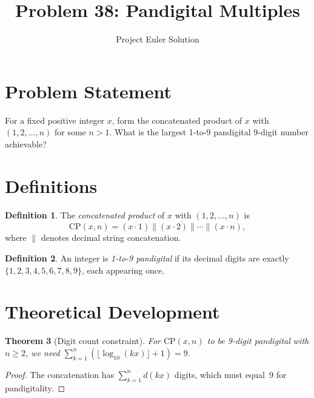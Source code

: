 \documentclass[12pt]{article}
\title{Problem 38: Pandigital Multiples}
\author{Project Euler Solution}
\date{}
\newtheorem{theorem}{Theorem}
\theoremstyle{definition}
\newtheorem{definition}[theorem]{Definition}
\begin{document}
\maketitle

\section{Problem Statement}
For a fixed positive integer $x$, form the concatenated product of $x$ with $(1, 2, \ldots, n)$ for some $n > 1$. What is the largest 1-to-9 pandigital 9-digit number achievable?

\section{Definitions}

\begin{definition}
The \emph{concatenated product} of $x$ with $(1, 2, \ldots, n)$ is
\[
    \mathrm{CP}(x, n) = \overline{(x \cdot 1) \| (x \cdot 2) \| \cdots \| (x \cdot n)},
\]
where $\|$ denotes decimal string concatenation.
\end{definition}

\begin{definition}
An integer is \emph{1-to-9 pandigital} if its decimal digits are exactly $\{1,2,3,4,5,6,7,8,9\}$, each appearing once.
\end{definition}

\section{Theoretical Development}

\begin{theorem}[Digit count constraint]
\label{thm:digits}
For $\mathrm{CP}(x,n)$ to be 9-digit pandigital with $n \ge 2$, we need $\sum_{k=1}^{n} (\lfloor \log_{10}(kx) \rfloor + 1) = 9$.
\end{theorem}
\begin{proof}
The concatenation has $\sum_{k=1}^n d(kx)$ digits, which must equal~9 for pandigitality.
\end{proof}
\end{document}
